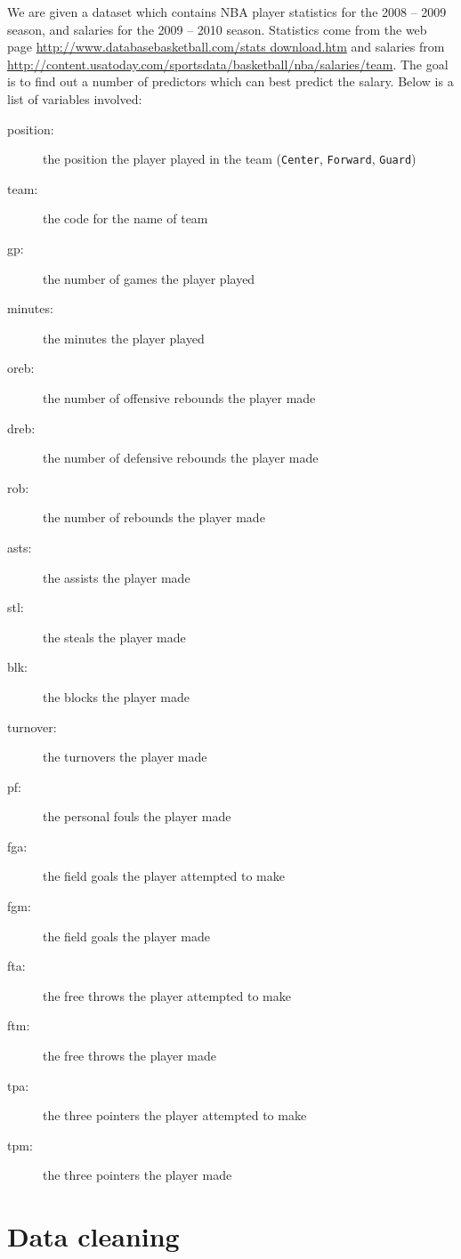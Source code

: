 \documentclass[english]{article}
\begin{document}
We are given a dataset which contains NBA player statistics for the
2008 -- 2009 season, and salaries for the 2009 -- 2010 season. Statistics
come from the web page \url{http://www.databasebasketball.com/stats download.htm}
and salaries from \url{http://content.usatoday.com/sportsdata/basketball/nba/salaries/team}.
The goal is to find out a number of predictors which can best predict
the salary. Below is a list of variables involved:
\begin{description}
\item [{position:}] the position the player played in the team (\texttt{Center},
\texttt{Forward}, \texttt{Guard}) 
\item [{team:}] the code for the name of team 
\item [{gp:}] the number of games the player played 
\item [{minutes:}] the minutes the player played 
\item [{oreb:}] the number of offensive rebounds the player made 
\item [{dreb:}] the number of defensive rebounds the player made 
\item [{rob:}] the number of rebounds the player made
\item [{asts:}] the assists the player made 
\item [{stl:}] the steals the player made
\item [{blk:}] the blocks the player made 
\item [{turnover:}] the turnovers the player made
\item [{pf:}] the personal fouls the player made 
\item [{fga:}] the field goals the player attempted to make 
\item [{fgm:}] the field goals the player made
\item [{fta:}] the free throws the player attempted to make 
\item [{ftm:}] the free throws the player made
\item [{tpa:}] the three pointers the player attempted to make 
\item [{tpm:}] the three pointers the player made
\end{description}

\section{Data cleaning\label{sec:clean}}
\end{document}
